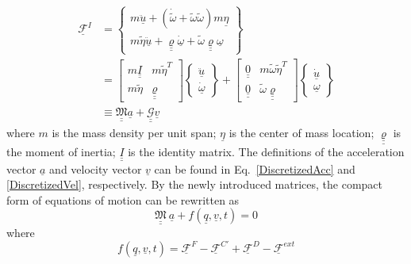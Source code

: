 \documentclass{aiaa-tc}
\newcommand{\tens}[1]{\underline{\underline{#1}}}
\begin{document}
\begin{align}
    \underline{\mathcal{F}}^I &= \begin{Bmatrix}
    m \ddot{\underline{u}} + ( \dot{\tilde{\omega}} + \tilde{\omega} \tilde{\omega} ) m \underline{\eta} \\
    m \tilde{\eta} \ddot{\underline{u}} + \underline{\underline{\varrho}} \dot{\underline{\omega}} + \tilde{\omega}  \underline{\underline{\varrho}} \underline{\omega} 
    \end{Bmatrix} \nonumber \\
    \label{InertialForce2}
    &= \begin{bmatrix}
    m \underline{\underline{I}} & m \tilde{\eta}^T \\
    m \tilde{\eta} & \underline{\underline{\varrho}}
    \end{bmatrix}
    \begin{Bmatrix}
    \ddot{\underline{u}} \\
    \dot{\underline{\omega}}
    \end{Bmatrix} + 
    \begin{bmatrix}
    \underline{\underline{0}} & m \tilde{\omega} \tilde{\eta}^T \\
    \underline{\underline{0}} & \tilde{\omega}  \underline{\underline{\varrho}}
    \end{bmatrix}
    \begin{Bmatrix}
    \dot{\underline{u}} \\
    \underline{\omega}
    \end{Bmatrix} \\
    &  \equiv \underline{\underline{\mathfrak{M}}} \underline{a} + \underline{\underline{\mathcal{G}}} \underline{v}  \nonumber     
\end{align}
where $m$ is the mass density per unit span; $\underline{\eta}$ is the
center of mass location;  $\underline{\underline{\varrho}}$ is the moment of
inertia; $\tens{I}$ is the identity matrix. The definitions of the acceleration vector $\underline{a}$ and velocity vector $\underline{v}$ can be found in Eq.~\eqref{DiscretizedAcc} and \eqref{DiscretizedVel}, respectively. By the newly introduced matrices, the compact form of equations of motion can be rewritten as
\begin{equation}
    \label{CompactForm2}
    \underline{\underline{\mathfrak{M}}}~ \underline{a} + f(\underline{q},\underline{v},t) = 0
\end{equation}
where
\begin{equation}
    \label{CompactForm3}
    f(\underline{q},\underline{v},t) = \underline{\mathcal{F}}^F - \underline{\mathcal{F}}^{C\prime} + \underline{\mathcal{F}}^D - \underline{\mathcal{F}}^{ext}
\end{equation}
\end{document}
